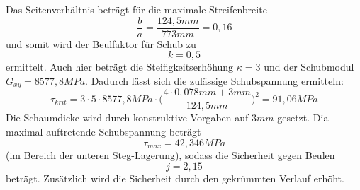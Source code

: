 \noindent Das Seitenverhältnis beträgt für die maximale Streifenbreite
\begin{equation}
	\frac{b}{a}=\frac{124,5 mm}{773 mm}=0,16
\end{equation}
und somit wird der Beulfaktor für Schub zu 
\begin{equation}
	k=0,5
\end{equation} ermittelt. Auch hier beträgt die Steifigkeitserhöhung $\kappa=3$ und der Schubmodul $G_{xy}=8577,8 MPa$. Dadurch lässt sich die zulässige Schubspannung ermitteln:
\begin{equation}
	\tau_{krit}=3\cdot 5\cdot 8577,8 MPa\cdot\biggl(\frac{4\cdot 0,078mm + 3mm}{124,5 mm}\biggr)^{2} =91,06 MPa
\end{equation}
Die Schaumdicke wird durch konstruktive Vorgaben auf $3 mm$ gesetzt. Dia maximal auftretende Schubspannung beträgt
\begin{equation}
	\tau_{max}=42,346 MPa
\end{equation}
(im Bereich der unteren Steg-Lagerung), sodass die Sicherheit gegen Beulen 
\begin{equation}
	j=2,15
\end{equation}
beträgt. Zusätzlich wird die Sicherheit durch den gekrümmten Verlauf erhöht.